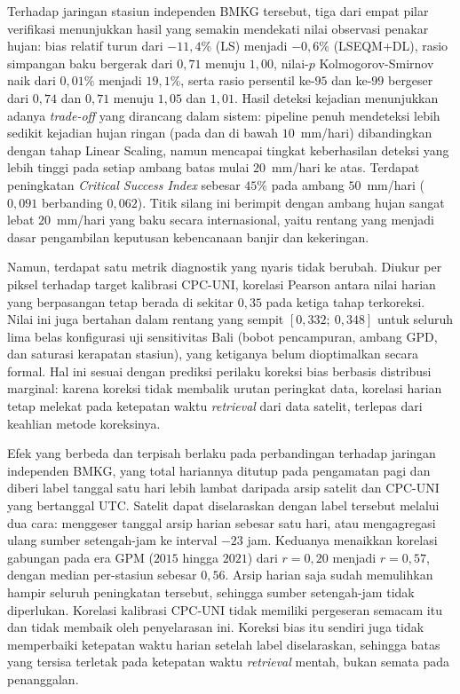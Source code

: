 Terhadap jaringan stasiun independen BMKG tersebut, tiga dari empat
pilar verifikasi menunjukkan hasil yang semakin mendekati nilai observasi penakar hujan:
bias relatif turun dari $-11{,}4\%$ (LS) menjadi $-0{,}6\%$ (LSEQM+DL), rasio
simpangan baku bergerak dari $0{,}71$ menuju $1{,}00$, nilai-$p$
Kolmogorov-Smirnov naik dari $0{,}01\%$ menjadi $19{,}1\%$, serta rasio
persentil ke-$95$ dan ke-$99$ bergeser dari $0{,}74$ dan $0{,}71$ menuju
$1{,}05$ dan $1{,}01$. Hasil deteksi kejadian menunjukkan adanya \emph{trade-off} 
yang dirancang dalam sistem: pipeline penuh mendeteksi lebih sedikit kejadian hujan ringan
(pada dan di bawah $10$~mm/hari) dibandingkan dengan tahap Linear Scaling, namun
mencapai tingkat keberhasilan deteksi yang lebih tinggi
pada setiap ambang batas mulai $20$~mm/hari ke atas. Terdapat peningkatan
\emph{Critical Success Index} sebesar $45\%$ pada ambang $50$~mm/hari ($0{,}091$
berbanding $0{,}062$). Titik silang ini berimpit dengan ambang hujan sangat
lebat $20$~mm/hari yang baku secara internasional, yaitu rentang yang menjadi
dasar pengambilan keputusan kebencanaan banjir dan kekeringan.

Namun, terdapat satu metrik diagnostik yang nyaris tidak berubah.
Diukur per piksel terhadap target kalibrasi CPC-UNI, korelasi Pearson antara
nilai harian yang berpasangan tetap
berada di sekitar $0{,}35$ pada ketiga tahap terkoreksi. Nilai ini juga bertahan dalam
rentang yang sempit $[0{,}332;~0{,}348]$ untuk seluruh lima belas konfigurasi
uji sensitivitas Bali (bobot pencampuran, ambang GPD, dan saturasi kerapatan stasiun),
yang ketiganya belum dioptimalkan secara formal.
Hal ini sesuai dengan prediksi perilaku koreksi bias berbasis distribusi marginal: karena
koreksi tidak membalik urutan peringkat data, korelasi harian tetap melekat
pada ketepatan waktu \emph{retrieval} dari data satelit, terlepas dari keahlian metode
koreksinya.

Efek yang berbeda dan terpisah berlaku pada perbandingan terhadap jaringan
independen BMKG, yang total hariannya ditutup pada pengamatan pagi dan diberi
label tanggal satu hari lebih lambat daripada arsip satelit dan CPC-UNI yang
bertanggal UTC. Satelit dapat diselaraskan dengan label tersebut melalui dua
cara: menggeser tanggal arsip harian sebesar satu hari, atau mengagregasi
ulang sumber setengah-jam ke interval $-23$ jam. Keduanya menaikkan korelasi
gabungan pada era GPM ($2015$ hingga $2021$)
dari $r = 0{,}20$ menjadi $r = 0{,}57$, dengan median
per-stasiun sebesar $0{,}56$. Arsip harian saja sudah memulihkan hampir seluruh
peningkatan tersebut, sehingga sumber setengah-jam tidak diperlukan. Korelasi
kalibrasi CPC-UNI tidak memiliki pergeseran semacam itu dan tidak membaik oleh
penyelarasan ini. Koreksi bias itu sendiri juga tidak memperbaiki ketepatan
waktu harian setelah label diselaraskan, sehingga batas yang tersisa terletak
pada ketepatan waktu \emph{retrieval} mentah, bukan semata pada penanggalan.

